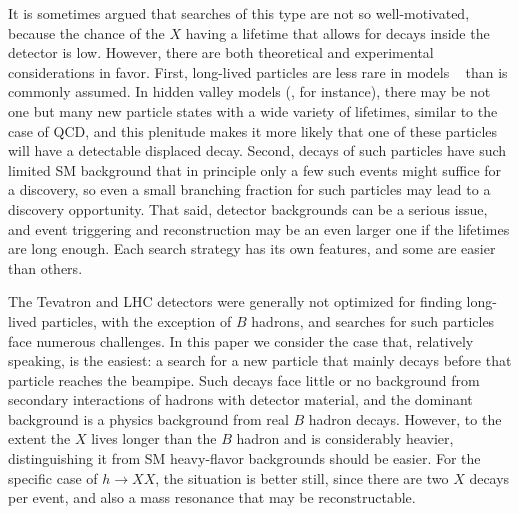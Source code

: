 \documentclass{JHEP3}
\begin{document}
It is sometimes argued that searches of this type are not so well-motivated, because the chance of the $X$
having a lifetime that allows for decays inside the detector is low.  However, there are both theoretical and
experimental considerations in favor. First, long-lived particles are less rare in models
~\cite{Barbier:2004ez,Dermisek:2005ar,Chang:2005ht,Strassler:2006ri,Carpenter:2007zz,AristizabalSierra:2008ye,Kang:2008ea,Cheung:2008ke,Bellazzini:2009xt,Juknevich:2009ji,Falkowski:2010cm,Englert:2011us,Graham:2012th}
than is commonly assumed.  In hidden valley models (\cite{SZhv}, for instance), there may be not one but many
new particle states with a wide variety of lifetimes, similar to the case of QCD, and this plenitude makes it
more likely that one of these particles will have a detectable displaced decay. Second, decays of such
particles have such limited SM background that in principle only a few such events might suffice for a
discovery, so even a small branching fraction for such particles may lead to a discovery opportunity.  That
said, detector backgrounds can be a serious issue, and event triggering and reconstruction may be an even
larger one if the lifetimes are long enough.  Each search strategy has its own features, and some are easier
than others.

The Tevatron and LHC detectors were generally not optimized for finding long-lived particles, with the exception of $B$ hadrons, 
and searches for such particles face numerous challenges.  In this paper we consider the case that, relatively speaking, is the 
easiest: a search for a new particle that mainly decays before that particle reaches the beampipe.  Such decays face little or no 
background from secondary interactions of hadrons with detector material, and the dominant background is a physics background from 
real $B$ hadron decays.   However, to the extent the $X$ lives longer than the $B$ hadron and is considerably heavier, distinguishing 
it from SM heavy-flavor backgrounds should be easier.  For the specific case of $h\to XX$, the situation is better still, since there
 are two $X$ decays per event, and also a mass resonance that may be reconstructable.
\end{document}
